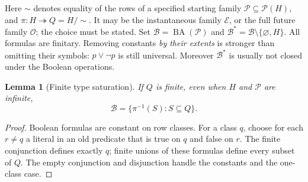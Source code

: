 \documentclass[11pt]{article}
\newtheorem{lemma}[theorem]{Lemma}
\theoremstyle{definition}
\newcommand{\Pow}{\mathcal P}
\newcommand{\BA}{\operatorname{BA}}
\begin{document}
Here $\sim$ denotes equality of the rows of a specified starting family
$\mathcal P\subseteq\Pow(H)$, and $\pi:H\twoheadrightarrow Q=H/{\sim}$.
It may be the instantaneous family $\mathcal E$, or the full future family
$\mathcal O$; the choice must be stated. Set
$\mathcal B=\BA(\mathcal P)$ and
$\mathcal B^*=\mathcal B\setminus\{\varnothing,H\}$.
All formulas are finitary. Removing constants \emph{by their extents} is
stronger than omitting their symbols: $p\vee\neg p$ is still universal.
Moreover $\mathcal B^*$ is usually not closed under the Boolean operations.

\begin{lemma}[Finite type saturation]\label{lem:finite-types}
If $Q$ is finite, even when $H$ and $\mathcal P$ are infinite,
\[
 \mathcal B=\{\pi^{-1}(S):S\subseteq Q\}.
\]
\end{lemma}
\begin{proof}
Boolean formulas are constant on row classes. For a class $q$, choose
for each $r\ne q$ a literal in an old predicate that is true on $q$ and
false on $r$. The finite conjunction defines exactly $q$; finite unions
of these formulas define every subset of $Q$. The empty conjunction and
disjunction handle the constants and the one-class case.
\end{proof}
\end{document}
